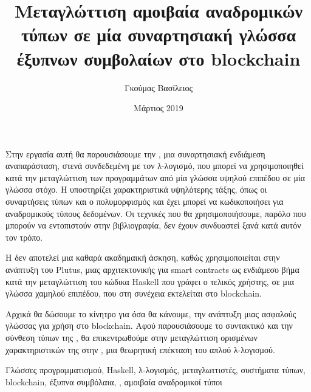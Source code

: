\documentclass[diploma]{softlab-thesis}
\begin{document}

\frontmatter

\title{Μεταγλώττιση αμοιβαία αναδρομικών τύπων σε μία συναρτησιακή γλώσσα έξυπνων συμβολαίων στο blockchain}
\author{Γκούμας Βασίλειος}
\date{Μάρτιος 2019}




\maketitle



\begin{abstractgr}%
Στην εργασία αυτή θα παρουσιάσουμε την \FIR{}, μια συναρτησιακή ενδιάμεση αναπαράσταση, στενά
συνδεδεμένη με τον λ-λογισμό, που μπορεί να χρησιμοποιηθεί  κατά
την μεταγλώττιση των προγραμμάτων από μία γλώσσα υψηλού επιπέδου σε μία γλώσσα στόχο. Η \FIR{}
υποστηρίζει χαρακτηριστικά υψηλότερης τάξης, όπως οι συναρτήσεις τύπων
και ο πολυμορφισμός και έχει μπορεί να κωδικοποιήσει για αναδρομικούς τύπους δεδομένων. Οι τεχνικές
που θα χρησιμοποιήσουμε, παρόλο που μπορούν να εντοπιστούν στην βιβλιογραφία, δεν έχουν συνδυαστεί
ξανά κατά αυτόν τον τρόπο.

Η \FIR{} δεν αποτελεί μια καθαρά ακαδημαική άσκηση, καθώς χρησιμοποιείται στην ανάπτυξη του Plutus,
μιας αρχιτεκτονικής για smart contracts ως ενδιάμεσο βήμα κατά την μεταγλώττιση του
κώδικα Haskell που γράφει ο τελικός χρήστης, σε μια γλώσσα χαμηλού επιπέδου, που στη συνέχεια
εκτελείται στο blockchain.

Αρχικά θα δώσουμε το κίνητρο για όσα θα κάνουμε, την ανάπτυξη μιας ασφαλούς γλώσσας για
χρήση στο blockchain.  Αφού παρουσιάσουμε το συντακτικό και την σύνθεση τύπων της \FIR{}, θα επικεντρωθούμε  στην
μεταγλώττιση ορισμένων χαρακτηριστικών της στην \FOMF, μια θεωρητική επέκταση του απλού λ-λογισμού.

\begin{keywordsgr}
Γλώσσες προγραμματισμού, Haskell, λ-λογισμός, μεταγλωττιστές, συστήματα τύπων, blockchain, έξυπνα 
συμβόλαια, \FOM{},
αμοιβαία αναδρομικοί τύποι
\end{keywordsgr}
\end{abstractgr}
\end{document}
